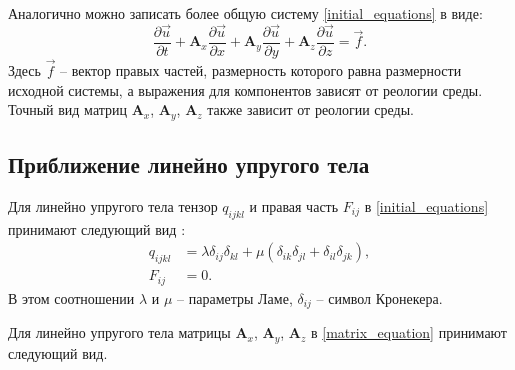 Аналогично можно записать более общую систему \eqref{initial_equations} в виде:
\begin{equation}
\label{matrix_equation}
\frac{\partial\vec{u}}{\partial{t}}+\mathbf{A}_x\frac{\partial\vec{u}}{\partial{x}}+
\mathbf{A}_y\frac{\partial\vec{u}}{\partial{y}}+
\mathbf{A}_z\frac{\partial\vec{u}}{\partial{z}}=\vec{f}.
\end{equation}
Здесь $\vec{f}$ -- вектор правых частей, размерность которого равна размерности исходной системы, а выражения для компонентов зависят от реологии среды. Точный вид матриц $\mathbf{A}_x$, $\mathbf{A}_y$, $\mathbf{A}_z$ также зависит от реологии среды.

\clearpage
\newpage

\subsection{Приближение линейно упругого тела}
\label{sec:elastic_matrixes}

Для линейно упругого тела тензор $q_{ijkl}$ и правая часть $F_{ij}$ в \eqref{initial_equations} принимают следующий вид \cite{landau_lifshits}:
\begin{align}
\label{tensor_qijkl_elastic}
q_{ijkl}&=\lambda\delta_{ij}\delta_{kl}+\mu(\delta_{ik}\delta_{jl}+\delta_{il}
\delta_{jk}),\nonumber\\
F_{ij}&=0.
\end{align}
В этом соотношении $\lambda$ и $\mu$ -- параметры Ламе, $\delta_{ij}$ -- символ Кронекера.

Для линейно упругого тела матрицы $\mathbf{A}_x$, $\mathbf{A}_y$, $\mathbf{A}_z$ в \eqref{matrix_equation} принимают следующий вид.

